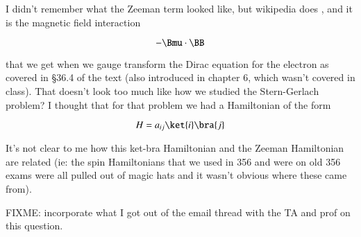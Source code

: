 I didn't remember what the Zeeman term looked like, but wikipedia does \cite{wiki:zeeman}, and it is the magnetic field interaction

\begin{equation}\label{eqn:qmTwoL1:391}
-\Bmu \cdot \BB
\end{equation}

that we get when we gauge transform the Dirac equation for the electron as covered in \S 36.4 of the text (also introduced in chapter 6, which wasn't covered in class).  That doesn't look too much like how we studied the Stern-Gerlach problem?  I thought that for that problem we had a Hamiltonian of the form

\begin{equation}\label{eqn:qmTwoL1:392}
H = a_{i j} \ket{i} \bra{j}
\end{equation}

It's not clear to me how this ket-bra Hamiltonian and the Zeeman Hamiltonian are related (ie: the spin Hamiltonians that we used in 356 and were on old 356 exams were all pulled out of magic hats and it wasn't obvious where these came from).

FIXME: incorporate what I got out of the email thread with the TA and prof on this question.

\EndArticle
